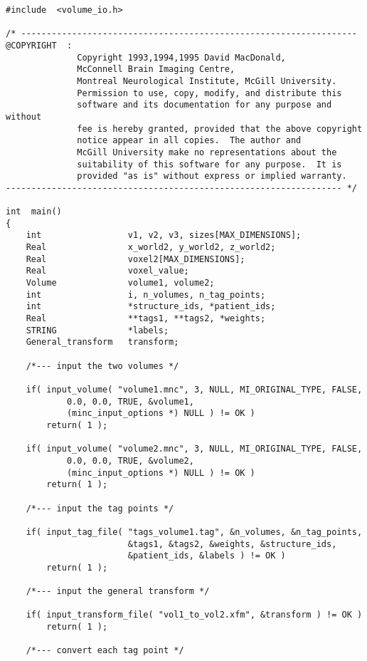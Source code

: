 {\small
\begin{verbatim}
#include  <volume_io.h>

/* ------------------------------------------------------------------
@COPYRIGHT  :
              Copyright 1993,1994,1995 David MacDonald,
              McConnell Brain Imaging Centre,
              Montreal Neurological Institute, McGill University.
              Permission to use, copy, modify, and distribute this
              software and its documentation for any purpose and without
              fee is hereby granted, provided that the above copyright
              notice appear in all copies.  The author and
              McGill University make no representations about the
              suitability of this software for any purpose.  It is
              provided "as is" without express or implied warranty.
------------------------------------------------------------------ */

int  main()
{
    int                 v1, v2, v3, sizes[MAX_DIMENSIONS];
    Real                x_world2, y_world2, z_world2;
    Real                voxel2[MAX_DIMENSIONS];
    Real                voxel_value;
    Volume              volume1, volume2;
    int                 i, n_volumes, n_tag_points;
    int                 *structure_ids, *patient_ids;
    Real                **tags1, **tags2, *weights;
    STRING              *labels;
    General_transform   transform;

    /*--- input the two volumes */

    if( input_volume( "volume1.mnc", 3, NULL, MI_ORIGINAL_TYPE, FALSE,
            0.0, 0.0, TRUE, &volume1,
            (minc_input_options *) NULL ) != OK )
        return( 1 );

    if( input_volume( "volume2.mnc", 3, NULL, MI_ORIGINAL_TYPE, FALSE,
            0.0, 0.0, TRUE, &volume2,
            (minc_input_options *) NULL ) != OK )
        return( 1 );

    /*--- input the tag points */

    if( input_tag_file( "tags_volume1.tag", &n_volumes, &n_tag_points,
                        &tags1, &tags2, &weights, &structure_ids,
                        &patient_ids, &labels ) != OK )
        return( 1 );

    /*--- input the general transform */

    if( input_transform_file( "vol1_to_vol2.xfm", &transform ) != OK )
        return( 1 );

    /*--- convert each tag point */


\end{verbatim}}
